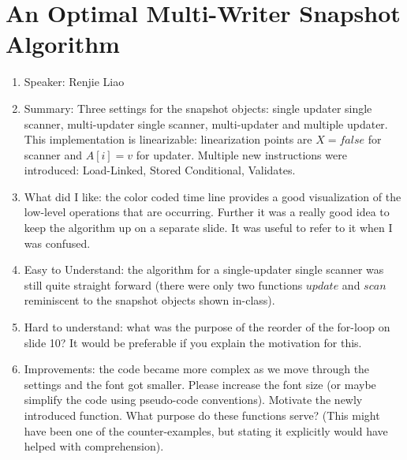 \documentclass[twoside]{article}
\begin{document}
\section{An Optimal Multi-Writer Snapshot Algorithm}
\begin{enumerate}
\item Speaker: Renjie Liao
\item Summary: Three settings for the snapshot objects: single updater single scanner, multi-updater single scanner, multi-updater and multiple updater. This implementation is linearizable: linearization points are $X = false$ for scanner and $A[i] = v$ for updater. Multiple new instructions were introduced: Load-Linked, Stored Conditional, Validates. 
\item What did I like: the color coded time line provides a good visualization of the low-level operations that are occurring. Further it was a really good idea to keep the algorithm up on a separate slide. It was useful to refer to it when I was confused.
\item Easy to Understand: the algorithm for a single-updater single scanner was still quite straight forward (there were only two functions $update$ and $scan$ reminiscent to the snapshot objects shown in-class). 
\item Hard to understand: what was the purpose of the reorder of the for-loop on slide 10? It would be preferable if you explain the motivation for this. 
\item Improvements: the code became more complex as we move through the settings and the font got smaller. Please increase the font size (or maybe simplify the code using pseudo-code conventions). Motivate the newly introduced function. What purpose do these functions serve? (This might have been one of the counter-examples, but stating it explicitly would have helped with comprehension).
\end{enumerate}
\end{document}
